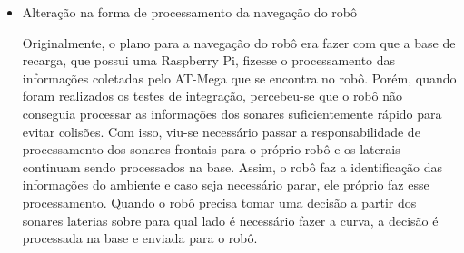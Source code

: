\begin{itemize}
      \item Alteração na forma de processamento da navegação do robô

      Originalmente, o plano para a navegação do robô era fazer com que a base de recarga, que possui uma Raspberry Pi, fizesse o processamento das informações coletadas pelo AT-Mega que se encontra no robô. Porém, quando foram realizados os testes de integração, percebeu-se que o robô não conseguia processar as informações dos sonares suficientemente rápido para evitar colisões. Com isso, viu-se necessário passar a responsabilidade de processamento dos sonares frontais para o próprio robô e os laterais continuam sendo processados na base. Assim, o robô faz a identificação das informações do ambiente e caso seja necessário parar, ele próprio faz esse processamento. Quando o robô precisa tomar uma decisão a partir dos sonares laterias sobre para qual lado é necessário fazer a curva, a decisão é processada na base e enviada para o robô.

   \end{itemize}


